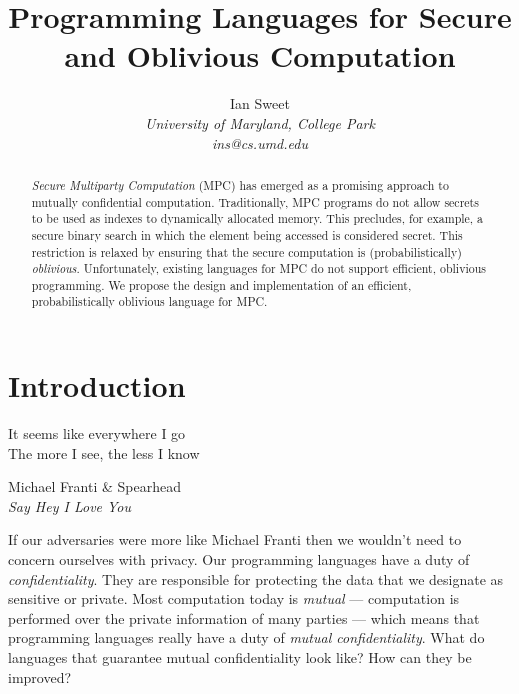 \documentclass{report}
\begin{document}
\title{Programming Languages for Secure and Oblivious Computation}

\author{Ian Sweet \\
  \emph{University of Maryland, College Park} \\
  \emph{ins@cs.umd.edu}}

\date{}

\maketitle

\begin{abstract}

  \emph{Secure Multiparty Computation} (MPC) has emerged as a promising approach to mutually confidential computation.
  Traditionally, MPC programs do not allow secrets to be used as indexes to dynamically allocated memory.
  This precludes, for example, a secure binary search in which the element being accessed is considered secret.
  This restriction is relaxed by ensuring that the secure computation is (probabilistically) \emph{oblivious}.
  Unfortunately, existing languages for MPC do not support efficient, oblivious programming. We propose the design
  and implementation of an efficient, probabilistically oblivious language for MPC.
\end{abstract}

\tableofcontents

\chapter{Introduction}
\label{ch:intro}

\epigraph{It seems like everywhere I go \\
          The more I see, the less I know}{
            Michael Franti \& Spearhead \\
            \emph{Say Hey I Love You}}

If our adversaries were more like Michael Franti then we wouldn't need to concern ourselves with privacy.
Our programming languages have a duty of \emph{confidentiality}. They are responsible for protecting the
data that we designate as sensitive or private. Most computation today is \emph{mutual} --- computation
is performed over the private information of many parties --- which means that programming languages really
have a duty of \emph{mutual confidentiality}. What do languages that guarantee mutual confidentiality look
like? How can they be improved?
\end{document}
